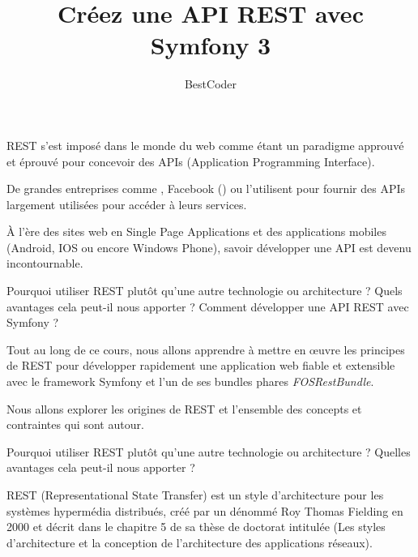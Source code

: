 \documentclass[big]{zmdocument}
\title{Créez une API REST avec Symfony 3}
\author{BestCoder}
\begin{document}
\maketitle
\tableofcontents

REST s'est imposé dans le monde du web comme étant un paradigme approuvé et éprouvé pour concevoir des APIs (Application Programming Interface).



De grandes entreprises comme , Facebook () ou  l'utilisent pour fournir des APIs largement utilisées pour accéder à leurs services.



À l’ère des sites web en Single Page Applications et des applications mobiles (Android, IOS ou encore Windows Phone), savoir développer une API est devenu incontournable.



Pourquoi utiliser REST plutôt qu'une autre technologie ou architecture ? Quels avantages cela peut-il nous apporter ? Comment développer une API REST avec Symfony ?



Tout au long de ce cours, nous allons apprendre à mettre en œuvre les principes de REST pour développer rapidement une application web fiable et extensible avec le framework Symfony et l'un de ses bundles phares \textit{FOSRestBundle}.





Nous allons explorer les origines de REST et l'ensemble des concepts et contraintes qui sont autour.



\begin{Question}
Pourquoi utiliser REST plutôt qu'une autre technologie ou architecture ? Quelles avantages cela peut-il nous apporter ?
\end{Question}






REST (Representational State Transfer) est un style d'architecture pour les systèmes hypermédia distribués, créé par un dénommé Roy Thomas Fielding en 2000 et décrit dans le chapitre 5 de sa thèse de doctorat intitulée  (Les styles d'architecture et la conception de l'architecture des applications réseaux).
\end{document}
